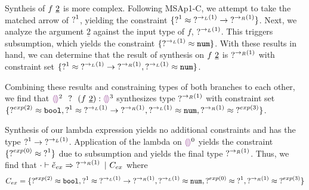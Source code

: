 Syntheis of $f ~\underline{2}$ is more complex. Following MSAp1-C, we attempt to take the matched arrow of $\operatorname{?}^1$, yielding the constraint $\{ \operatorname{?}^1 \approx \operatorname{?}^{\rightarrow_L(1)} \rightarrow \operatorname{?}^{\rightarrow_R(1)} \}$. Next, we analyze the argument $\underline{2}$ against the input type of $f$, $\operatorname{?}^{\rightarrow_L(1)}$. This triggers subsumption, which yields the constraint $\{ \operatorname{?}^{\rightarrow_L(1)} \approx \mathtt{num} \}$. With these results in hand, we can determine that the result of synthesis on  $f ~\underline{2}$ is $\operatorname{?}^{\rightarrow_R(1)}$ with constraint set $\{ \operatorname{?}^1 \approx \operatorname{?}^{\rightarrow_L(1)} \rightarrow \operatorname{?}^{\rightarrow_R(1)},  \operatorname{?}^{\rightarrow_L(1)} \approx \mathtt{num} \}$.

Combining these results and constraining types of both branches to each other, we find that $\ECIf{\EEHole^2~}{~(\ECAp{f}{\underline{2}})}{\EEHole^3}$ synthesizes type $\operatorname{?}^{\rightarrow_R(1)}$ with constraint set $\{ \operatorname{?}^{exp(2)} \approx \mathtt{bool}, \operatorname{?}^1 \approx \operatorname{?}^{\rightarrow_L(1)} \rightarrow \operatorname{?}^{\rightarrow_R(1)},  \operatorname{?}^{\rightarrow_L(1)} \approx \mathtt{num},  \operatorname{?}^{\rightarrow_R(1)} \approx \operatorname{?}^{exp(3)}\}$. 

Synthesis of our lambda expression yields no additional constraints and has the type $\operatorname{?}^1 \rightarrow \operatorname{?}^{\rightarrow_L(1)}$. Application of the lambda on $\EEHole^0$ yields the constraint $\{ \operatorname{?}^{exp(0)} \approx \operatorname{?}^{1} \}$ due to subsumption and yields the final type  $\operatorname{?}^{\rightarrow_R(1)}$. Thus, we find that $\cdot \vdash \check{e}_{ex} \Rightarrow \operatorname{?}^{\rightarrow_R(1)} ~|~ C_{ex}$ where 
$$C_{ex} = \{ \operatorname{?}^{exp(2)} \approx \mathtt{bool}, \operatorname{?}^1 \approx \operatorname{?}^{\rightarrow_L(1)} \rightarrow \operatorname{?}^{\rightarrow_R(1)},  \operatorname{?}^{\rightarrow_L(1)} \approx \mathtt{num}, \operatorname{?}^{exp(0)} \approx \operatorname{?}^{1}, \operatorname{?}^{\rightarrow_R(1)} \approx \operatorname{?}^{exp(3)} \}$$

